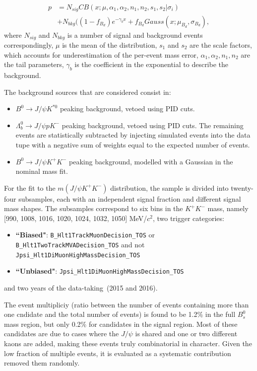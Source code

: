 \begin{align*}
p &= N_{sig} CB(x;\mu,\alpha_1,\alpha_2,n_1,n_2,s_1,s_2 | \sigma_{i}) \\
&+ N_{bkg}((1-f_{B_d})e^{-\gamma_b x} + f_{B_d} Gauss(x;\mu_{B_d},\sigma_{B_d}),
\end{align*}
where $N_{sig}$ and $N_{bkg}$ is a number of signal and background events
correspondingly, $\mu$ is the mean of the distribution,
$s_1$ and $s_2$ are the scale factors, which accounts for underestimation of the per-event
mass error, $\alpha_1, \alpha_2, n_1, n_2$ are the tail parameters,
$\gamma_b$ is the coefficient in the exponential to describe the background.

The background sources that are considered consist in:
\begin{itemize}
\item $B^0 \rightarrow J/\psi K^{*0}$ peaking background, vetoed using PID cuts. 
\item $\Lambda_b^0 \rightarrow J/\psi pK^-$ peaking background, vetoed using PID cuts. The remaining events are statistically subtracted by injecting simulated events into the data tupe with a negative sum of weights equal to the expected number of events. 
\item $B^0 \rightarrow J/\psi K^+ K^-$ peaking background, modelled with a Gaussian in the nominal mass fit. 
\end{itemize}

For the fit to the $m(J/\psi K^+ K^-)$ distribution, the sample is divided
into twenty-four subsamples, each with an independent signal fraction and different
signal mass shapes. The subsamples correspond to six bins in the $K^+K^-$ mass,
namely [990, 1008, 1016, 1020, 1024, 1032, 1050] MeV/$c^2$, two trigger 
categories:
\begin{itemize}
\item \textbf{``Biased"}: {\tt B\_Hlt1TrackMuonDecision\_TOS} or {\tt B\_Hlt1TwoTrackMVADecision\_TOS} and not {\tt Jpsi\_Hlt1DiMuonHighMassDecision\_TOS} 
\item \textbf{``Unbiased"}: {\tt Jpsi\_Hlt1DiMuonHighMassDecision\_TOS}
\end{itemize}
and two years of the data-taking~(2015 and 2016). 

The event multipliciy (ratio between the number of events containing more than one cndidate and the total number of events) is found to be 1.2\% in the full $B_s^0$ mass region, but only 0.2\% for candidates in the signal region. Most of these candidates 
are due to cases where the $J/\psi$ is shared and one or two different kaons are added, making these events truly combinatorial in character. Given the low fraction of multiple events, it is evaluated as a systematic contribution removed them randomly. 

